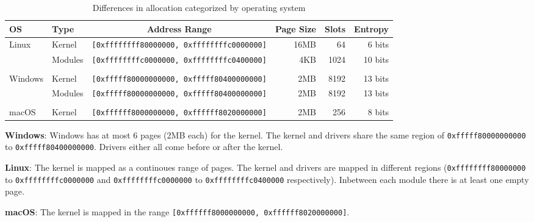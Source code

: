 \begin{table*}[!ht]
  \small
  \centering
  \begin{tabular}{llcrrr}
  \hline
    \textbf{OS} & \textbf{Type} & \textbf{Address Range} & \textbf{Page Size} & \textbf{Slots} & \textbf{Entropy} \\ \hline
    \multirow{2}{*}{Linux}   & Kernel  & {\lstinline[basicstyle=\ttfamily]![0xffffffff80000000, 0xffffffffc0000000]!} & 16MB &   64 &  6 bits \\
                             & Modules & {\lstinline[basicstyle=\ttfamily]![0xffffffffc0000000, 0xffffffffc0400000]!} &  4KB & 1024 & 10 bits \\ \\
    \multirow{2}{*}{Windows} & Kernel  & {\lstinline[basicstyle=\ttfamily]![0xfffff80000000000, 0xfffff80400000000]!} &  2MB & 8192 & 13 bits \\
                             & Modules & {\lstinline[basicstyle=\ttfamily]![0xfffff80000000000, 0xfffff80400000000]!} &  2MB & 8192 & 13 bits \\ \\
    macOS   & Kernel  & {\lstinline[basicstyle=\ttfamily]![0xffffff8000000000, 0xffffff8020000000]!} &  2MB &  256 &  8 bits \\ \hline
  \end{tabular}
  \caption{Differences in allocation categorized by operating system{\cite[Table~2]{drk}}}
\end{table*}

\textbf{Windows}: Windows has at most 6 pages (2MB each) for the kernel.
The kernel and drivers share the same region of \lstinline{0xfffff80000000000} to \lstinline{0xfffff80400000000}.
Drivers either all come before or after the kernel.\cite{drk}

\textbf{Linux}: The kernel is mapped as a continoues range of pages.
The kernel and drivers are mapped in different regions (\lstinline{0xffffffff80000000} to \lstinline{0xffffffffc0000000} and \lstinline{0xffffffffc0000000} to \lstinline{0xffffffffc0400000} respectively).
Inbetween each module there is at least one empty page.\cite{drk}

\textbf{macOS}: The kernel is mapped in the range \lstinline{[0xffffff8000000000, 0xffffff8020000000]}.\cite{drk}
